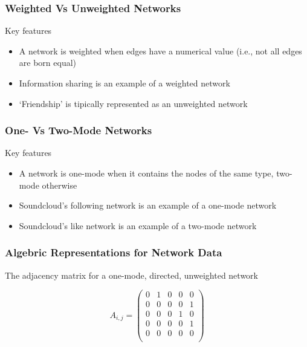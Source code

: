 \documentclass[notes, aspectratio=1610]{beamer}
\begin{document}
\begin{frame}
	\frametitle{Weighted Vs Unweighted Networks}

	Key features

		\begin{itemize}
			\item A network is weighted when edges have a numerical value
			(i.e., not all edges are born equal)
			\item Information sharing is an example of a
			weighted network 
			\item `Friendship' is tipically represented as an unweighted
			network
		\end{itemize}

\end{frame}

\begin{frame}
	\frametitle{One- Vs Two-Mode Networks}

	Key features

		\begin{itemize}
			\item A network is one-mode when it contains the nodes 
			of the same type, two-mode otherwise
			\item Soundcloud's following network is an example of a
			one-mode network 
			\item Soundcloud's like network is an example of a two-mode
			network
		\end{itemize}

\end{frame}

\begin{frame}
	\frametitle{Algebric Representations for Network Data}

	The adjacency matrix for a one-mode, directed, unweighted network

        \begin{equation}
        A_{i,j} = 
         \begin{pmatrix}
          0 & 1 & 0 & 0 & 0 \\
          0 & 0 & 0 & 0 & 1 \\
          0 & 0 & 0 & 1 & 0 \\
          0 & 0 & 0 & 0 & 1 \\
          0 & 0 & 0 & 0 & 0 \\
         \end{pmatrix}
        \end{equation}
	
\end{frame}
\end{document}
